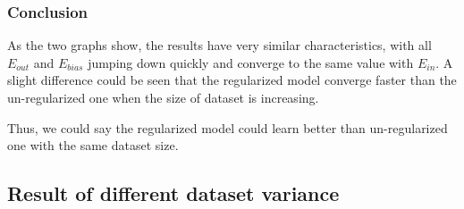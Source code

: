 \documentclass[12pt,letterpaper]{article}
\begin{document}
\subsubsection*{Conclusion}

As the two graphs show, the results have very similar characteristics, with all $E_{out}$ and $E_{bias}$ jumping down quickly and converge to the same value with $E_{in}$. A slight difference could be seen that the regularized model converge faster than the un-regularized one when the size of dataset is increasing.

Thus, we could say the regularized model could learn better than un-regularized one with the same dataset size.

\subsection{Result of different dataset variance}
\end{document}
